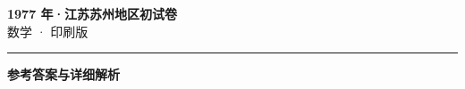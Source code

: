 \documentclass[zihao=5, a4paper]{ctexart}
\begin{document}
\begin{center}
  {\Large\bfseries 1977 年·江苏苏州地区初试卷}\\[4pt]
  {\large 数学 · 印刷版}
\end{center}
\medskip
{}

\par\bigskip\hrule\bigskip
{}
\begin{center}{\large\bfseries 参考答案与详细解析}\end{center}
\smallskip

\end{document}
